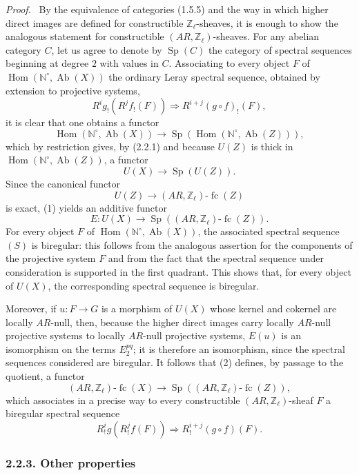 \documentclass[11pt]{article}
\newenvironment{prooftext}[1][Proof]{\par\noindent\emph{#1.}\ }{\par\medskip}
\DeclareMathOperator{\Hom}{Hom}
\providecommand{\Hom}{\operatorname{Hom}}
\providecommand{\Sp}{\operatorname{Sp}}
\providecommand{\Ab}{\operatorname{Ab}}
\providecommand{\fc}{\operatorname{fc}}
\providecommand{\Ab}{\operatorname{Ab}}
\begin{document}
\begin{prooftext}[Proof]
By the equivalence of categories (1.5.5) and the way in which higher direct images are defined for constructible \(\mathbb Z_\ell\)-sheaves, it is enough to show the analogous statement for constructible \((AR,\mathbb Z_\ell)\)-sheaves. For any abelian category \(C\), let us agree to denote by \(\Sp(C)\) the category of spectral sequences beginning at degree \(2\) with values in \(C\). Associating to every object \(F\) of \(\Hom(\mathbb N^\circ,\Ab(X))\) the ordinary Leray spectral sequence, obtained by extension to projective systems,
\[
R^i g_!(R^j f_!(F))\Longrightarrow R^{i+j}(g\circ f)_!(F),
\tag{S}
\]
it is clear that one obtains a functor
\[
\Hom(\mathbb N^\circ,\Ab(X))\longrightarrow \Sp(\Hom(\mathbb N^\circ,\Ab(Z))),
\]
which by restriction gives, by (2.2.1) and because \(U(Z)\) is thick in \(\Hom(\mathbb N^\circ,\Ab(Z))\), a functor
\[
U(X)\longrightarrow \Sp(U(Z)).
\tag{1}
\]
Since the canonical functor
\[
U(Z)\longrightarrow (AR,\mathbb Z_\ell)\text{-}\fc(Z)
\]
is exact, (1) yields an additive functor
\[
E:U(X)\longrightarrow \Sp((AR,\mathbb Z_\ell)\text{-}\fc(Z)).
\tag{2}
\]
For every object \(F\) of \(\Hom(\mathbb N^\circ,\Ab(X))\), the associated spectral sequence \((S)\) is biregular: this follows from the analogous assertion for the components of the projective system \(F\) and from the fact that the spectral sequence under consideration is supported in the first quadrant. This shows that, for every object of \(U(X)\), the corresponding spectral sequence is biregular.

Moreover, if \(u:F\to G\) is a morphism of \(U(X)\) whose kernel and cokernel are locally \(AR\)-null, then, because the higher direct images carry locally \(AR\)-null projective systems to locally \(AR\)-null projective systems, \(E(u)\) is an isomorphism on the terms \(E_2^{pq}\); it is therefore an isomorphism, since the spectral sequences considered are biregular. It follows that (2) defines, by passage to the quotient, a functor
\[
(AR,\mathbb Z_\ell)\text{-}\fc(X)
\longrightarrow \Sp((AR,\mathbb Z_\ell)\text{-}\fc(Z)),
\tag{3}
\]
which associates in a precise way to every constructible \((AR,\mathbb Z_\ell)\)-sheaf \(F\) a biregular spectral sequence
\[
R^i_!g(R^j_!f(F))\Longrightarrow R^{i+j}_!(g\circ f)(F).
\]
\end{prooftext}

\subsubsection*{2.2.3. Other properties}
\end{document}
